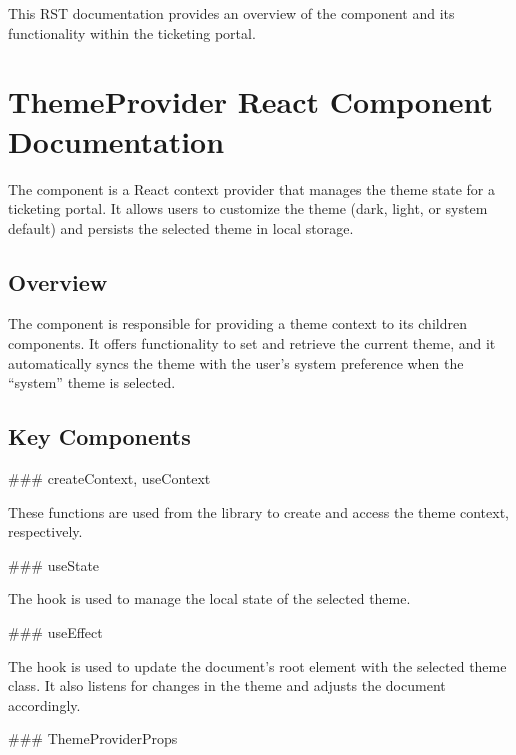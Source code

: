 \documentclass[letterpaper,10pt,english]{sphinxmanual}
\begin{document}
\sphinxAtStartPar
This RST documentation provides an overview of the  component and its functionality within the ticketing portal.

\sphinxstepscope


\section{ThemeProvider React Component Documentation}
\label{\detokenize{forms/theme:themeprovider-react-component-documentation}}\label{\detokenize{forms/theme::doc}}
\sphinxAtStartPar
The  component is a React context provider that manages the theme state for a ticketing portal. It allows users to customize the theme (dark, light, or system default) and persists the selected theme in local storage.


\subsection{Overview}
\label{\detokenize{forms/theme:overview}}
\sphinxAtStartPar
The  component is responsible for providing a theme context to its children components. It offers functionality to set and retrieve the current theme, and it automatically syncs the theme with the user’s system preference when the “system” theme is selected.


\subsection{Key Components}
\label{\detokenize{forms/theme:key-components}}
\sphinxAtStartPar
\#\#\# createContext, useContext

\sphinxAtStartPar
These functions are used from the  library to create and access the theme context, respectively.

\sphinxAtStartPar
\#\#\# useState

\sphinxAtStartPar
The  hook is used to manage the local state of the selected theme.

\sphinxAtStartPar
\#\#\# useEffect

\sphinxAtStartPar
The  hook is used to update the document’s root element with the selected theme class. It also listens for changes in the theme and adjusts the document accordingly.

\sphinxAtStartPar
\#\#\# ThemeProviderProps
\end{document}
